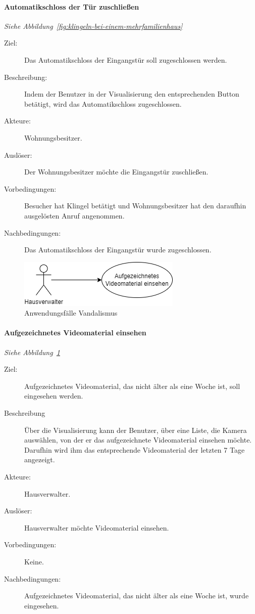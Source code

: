 \paragraph{\large{Automatikschloss der Tür zuschließen}}
\textit{Siehe Abbildung~\ref{fig:klingeln-bei-einem-mehrfamilienhaus}}
    \begin{description}
        \item[Ziel:] Das Automatikschloss der Eingangstür soll zugeschlossen werden.
        \item[Beschreibung:] Indem der Benutzer in der Visualisierung den entsprechenden Button betätigt, wird das Automatikschloss zugeschlossen.
        \item[Akteure:] Wohnungsbesitzer.
        \item[Auslöser:] Der Wohnungsbesitzer möchte die Eingangstür zuschließen.
        \item[Vorbedingungen:] Besucher hat Klingel betätigt und Wohnungsbesitzer hat den daraufhin ausgelösten Anruf angenommen.
        \item[Nachbedingungen:] Das Automatikschloss der Eingangstür wurde zugeschlossen.
    \end{description}


\begin{figure}[ht!]
    \centering
    \includegraphics[width=(\paperwidth-2in)/2]{../assets/img/UML-Anwendungsfalldiagramme-Vandalismus.drawio}
    \caption{Anwendungsfälle Vandalismus}
    \label{fig:vandalismus}
\end{figure}

\paragraph{\large{Aufgezeichnetes Videomaterial einsehen}}
\textit{Siehe Abbildung~\ref{fig:vandalismus}}
    \begin{description}
        \item[Ziel:] Aufgezeichnetes Videomaterial, das nicht älter als eine Woche ist, soll eingesehen werden.
        \item[Beschreibung] Über die Visualisierung kann der Benutzer, über eine Liste, die Kamera auswählen, von der er das aufgezeichnete Videomaterial einsehen möchte.
            Darufhin wird ihm das entsprechende Videomaterial der letzten 7 Tage angezeigt.
        \item[Akteure:] Hausverwalter.
        \item[Auslöser:] Hausverwalter möchte Videomaterial einsehen.
        \item[Vorbedingungen:] Keine.
        \item[Nachbedingungen:] Aufgezeichnetes Videomaterial, das nicht älter als eine Woche ist, wurde eingesehen.
    \end{description}


